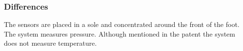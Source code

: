 \subsubsection{Differences}
The sensors are placed in a sole and concentrated around the front of the foot. The system measures pressure. Although mentioned in the patent the system does not measure temperature.
